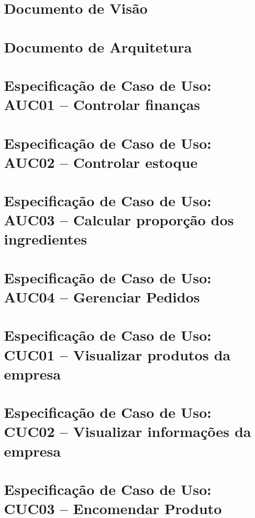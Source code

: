 \begin{anexosenv}
\partanexos
\chapter{Documento de Visão} \label{doc:visao}


\chapter{Documento de Arquitetura} \label{doc:arq}


\chapter{Especificação de Caso de Uso: AUC01 -- Controlar finanças} \label{doc:auc01}


\chapter{Especificação de Caso de Uso: AUC02 -- Controlar estoque} \label{doc:auc02}


\chapter{Especificação de Caso de Uso: AUC03 -- Calcular proporção dos ingredientes} \label{doc:auc03}


\chapter{Especificação de Caso de Uso: AUC04 -- Gerenciar Pedidos} \label{doc:auc04}


\chapter{Especificação de Caso de Uso: CUC01 -- Visualizar produtos da empresa} \label{doc:cuc01}


\chapter{Especificação de Caso de Uso: CUC02 -- Visualizar informações da empresa} \label{doc:cuc02}


\chapter{Especificação de Caso de Uso: CUC03 -- Encomendar Produto} \label{doc:cuc03}


\end{anexosenv}

